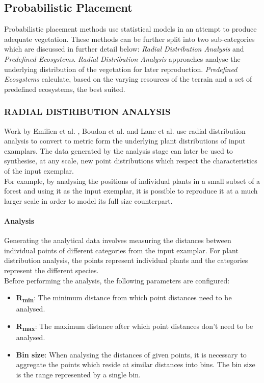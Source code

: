 \subsection{Probabilistic Placement} \label{Probabilistic Placement}

Probabilistic placement methods use statistical models in an attempt to produce adequate vegetation. These methods can be further split into two sub-categories which are discussed in further detail below: \textit{Radial Distribution Analysis} and \textit{Predefined Ecosystems}.
\textit{Radial Distribution Analysis} approaches analyse the underlying distribution of the vegetation for later reproduction. \textit{Predefined Ecosystems} calculate, based on the varying resources of the terrain and a set of predefined ecosystems, the best suited. \\

\subsubsection{RADIAL DISTRIBUTION ANALYSIS} \label{subsubsec:radial_distribution_analysis}
Work by Emilien et al. \cite{Emilien}, Boudon et al. \cite{Boudon2007} and Lane et al. \cite{Lane2002} use radial distribution analysis to convert to metric form the underlying plant distributions of input examplars. The data generated by the analysis stage can later be used to synthesise, at any scale, new point distributions which respect the characteristics of the input exemplar. \\
For example, by analysing the positions of individual plants in a small subset of a forest and using it as the input exemplar, it is possible to reproduce it at a much larger scale in order to model its full size counterpart.\\

\paragraph{Analysis}
Generating the analytical data involves measuring the distances between individual points of different categories from the input examplar. For plant distribution analysis, the points represent individual plants and the categories represent the different species.\\

Before performing the analysis, the following parameters are configured:
\begin{itemize}
\item \textbf{R\textsubscript{min}}: The minimum distance from which point distances need to be analysed.\\
\item \textbf{R\textsubscript{max}}: The maximum distance after which point distances don't need to be analysed.\\
\item \textbf{Bin size}: When analysing the distances of given points, it is necessary to aggregate the points which reside at similar distances into bins. The bin size is the range represented by a single bin.\\
\end{itemize}


